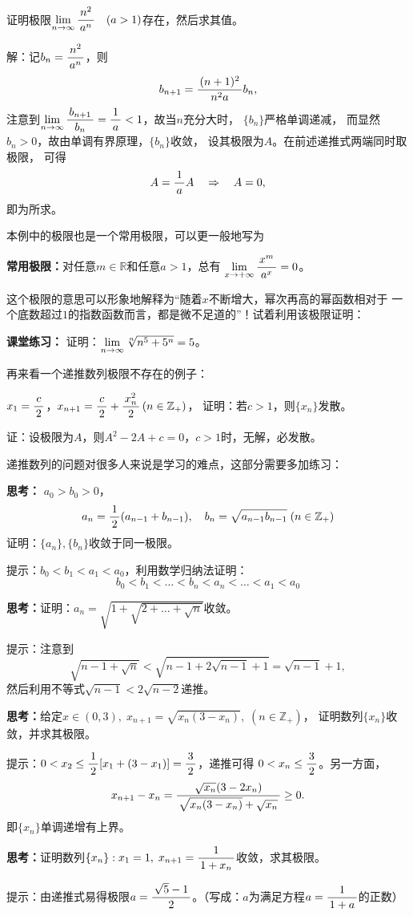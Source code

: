 \bs
\egz 证明极限$\lim\limits_{n\to\infty}\displaystyle\frac{\,{n^2}\,}{\,{a^n}\,}\quad (a>1)$存在，然后求其值。

解：记$b_n=\displaystyle\frac{\,{n^2}\,}{\,{a^n}\,}$，则
$$b_{n+1}=\displaystyle\frac{\,{(n+1)^2}\,}{\,{n^2a}\,}b_n,$$
注意到$\lim\limits_{n\to\infty}\displaystyle\frac{\,{b_{n+1}}\,}{\,{b_n}\,}=\displaystyle\frac{\,{1}\,}{\,{a}\,}<1$，故当$n$充分大时，
$\{b_n\}$严格单调递减，
而显然$b_n>0$，故由单调有界原理，$\{b_n\}$收敛，
设其极限为$A$。在前述递推式两端同时取极限，
可得
$$A=\displaystyle\frac{\,{1}\,}{\,{a}\,}A\quad\Rightarrow\quad A=0,$$
即为所求。\fin

本例中的极限也是一个常用极限，可以更一般地写为
\begin{thx}
	{\bf 常用极限：}对任意$m\in\mathbb{R}$和任意$a>1$，总有
	$\lim\limits_{x\to{+\infty}}\displaystyle\frac{\,{x^m}\,}{\,{a^x}\,}=0$。
\end{thx}
这个极限的意思可以形象地解释为“随着$x$不断增大，幂次再高的幂函数相对于
一个底数超过$1$的指数函数而言，都是微不足道的”！试着利用该极限证明：

{\bf 课堂练习：} 证明：$\lim\limits_{n\to\infty}\sqrt[n]{n^5+5^n}=5$。

\bs
再来看一个递推数列极限不存在的例子：

\egz $x_1=\displaystyle\frac{\,{c}\,}{\,{2}\,}$，$x_{n+1}=\displaystyle\frac{\,{c}\,}{\,{2}\,}+\displaystyle\frac{\,{x_n^2}\,}{\,{2}\,}\,(n\in\mathbb{Z}_+)$，
证明：若$c>1$，则$\{x_n\}$发散。

证：设极限为$A$，则$A^2-2A+c=0$，$c>1$时，无解，必发散。\fin

\bs
递推数列的问题对很多人来说是学习的难点，这部分需要多加练习：

\bs
{\bf 思考：} $a_0>b_0>0$，
$$a_n=\displaystyle\frac{\,{1}\,}{\,{2}\,}(a_{n-1}+b_{n-1}),\quad
b_n=\sqrt{a_{n-1}b_{n-1}}\;(n\in\mathbb{Z}_+)$$
证明：$\{a_n\},\{b_n\}$收敛于同一极限。

\ifhint
提示：$b_0<b_1<a_1<a_0$，利用数学归纳法证明：
$$b_0<b_1<\ldots<b_n<a_n<\ldots<a_1<a_0$$
\fi

\bs
{\bf 思考：}证明：$a_n=\sqrt{1+\sqrt{2+\ldots+\sqrt{n}}}$收敛。

\ifhint
提示：注意到
$$\sqrt{n-1+\sqrt n}<\sqrt{n-1+2\sqrt{n-1}+1}=\sqrt{n-1}+1,$$
然后利用不等式$\sqrt{n-1}<2\sqrt{n-2}$递推。
\fi

\bs
{\bf 思考：}给定$x\in(0,3),\; x_{n+1}=\sqrt{x_n(3-x_n)},
\;(n\in\mathbb{Z}_+)$，
证明数列$\{x_n\}$收敛，并求其极限。

\ifhint
提示：$0<x_2\leq\displaystyle\frac{\,{1}\,}{\,{2}\,}[x_1+(3-x_1)]=\displaystyle\frac{\,{3}\,}{\,{2}\,}$，递推可得
$0<x_n\leq\displaystyle\frac{\,{3}\,}{\,{2}\,}$。另一方面，
$$x_{n+1}-x_n=\displaystyle\frac{\,{\sqrt{x_n}(3-2x_n)}\,}{\,{\sqrt{x_n(3-x_n)}
+\sqrt{x_n}}\,}\geq 0.$$
即$\{x_n\}$单调递增有上界。
\fi

\bs
{\bf 思考：}证明数列$\{x_n\}:x_1=1,\;x_{n+1}
=\displaystyle\frac{\,{1}\,}{\,{1+x_n}\,}$收敛，求其极限。

\ifhint
提示：由递推式易得极限$a=\displaystyle\frac{\,{\sqrt5-1}\,}{\,{2}\,}$。（写成：$a$为满足方程$a=\displaystyle\frac{\,{1}\,}{\,{1+a}\,}$的正数）

